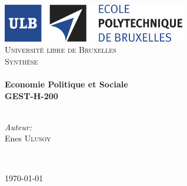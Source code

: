 
\begin{titlepage}
	\begin{center}
		
		\includegraphics[width=0.6\textwidth]{logoulb2}~\\[1cm]
			
			\textsc{\LARGE Université libre de Bruxelles}\\[1.5cm]
			
			\textsc{\Large Synthèse}\\[0.4cm]
			
			 
			\HRule \\[0.4cm]
			\LARGE
			\textbf{\bfseries Economie Politique et Sociale}\\[0.4cm]
			\textbf{GEST-H-200} \\[0.14cm]
			
			\HRule \\[1cm]
			\begin{minipage}{0.4\textwidth}
				\begin{flushleft} \large
					\emph{Auteur:}\\
					Enes \textsc{Ulusoy}\\
				\end{flushleft}
			\end{minipage}
			\begin{minipage}{0.40\textwidth}
				\
			\end{minipage}
			\vfill
			
			{\large \today}
		\end{center}
	\end{titlepage}
